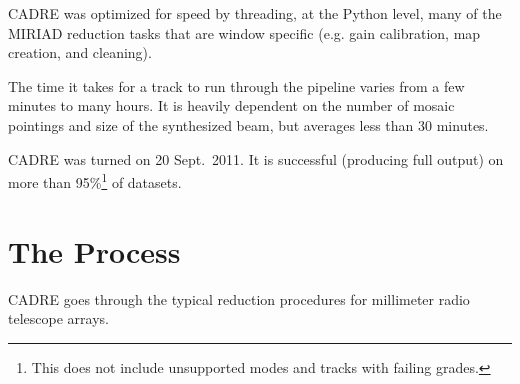 CADRE was optimized for speed by threading, at the Python level, many of the MIRIAD reduction tasks that are window specific (e.g. gain calibration, map creation, and cleaning).

The time it takes for a track to run through the pipeline varies from a few minutes to many hours. It is heavily dependent on the number of mosaic pointings and size of the synthesized beam, but averages less than 30 minutes.

CADRE was turned on 20 Sept.\ 2011. It is successful (producing full output) on more than 95\%\footnote{This does not include unsupported modes and tracks with failing grades.} of datasets.

\section{The Process}

CADRE goes through the typical reduction procedures for millimeter radio telescope arrays.

